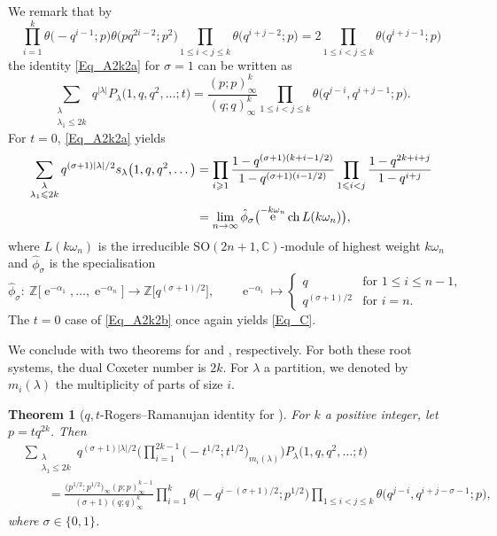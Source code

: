 \documentclass[pdftex]{sigma}
\numberwithin{equation}{section}
\newtheorem{Theorem}{Theorem}[section]
\renewcommand{\leq}{\leqslant}
\renewcommand{\geq}{\geqslant}
\DeclareMathOperator{\eup}{e}
\DeclareMathOperator{\ch}{ch}
\newcommand{\abs}[1]{\vert#1\vert}
\newcommand{\la}{\lambda}
\begin{document}
We remark that by
\[
\prod_{i=1}^k\theta\bigl(-q^{i-1};p\bigr)\theta\bigl(pq^{2i-2};p^2\bigr)
\prod_{1\leq i<j\leq k}\theta\bigl(q^{i+j-2};p\bigr)=
2\prod_{1\leq i<j\leq k}\theta\bigl(q^{i+j-1};p\bigr)
\]
the identity \eqref{Eq_A2k2a} for $\sigma=1$ can be written as
\[
\sum_{\substack{\la \\[1pt] \la_1\leq 2k}}
q^{\abs{\la}} P_{\la}\bigl(1,q,q^2,\dots;t\bigr)
=\frac{(p;p)_{\infty}^k}{(q;q)_{\infty}^k}
\prod_{1\leq i<j\leq k}\theta\bigl(q^{j-i},q^{i+j-1};p\bigr).
\]
For $t=0$, \eqref{Eq_A2k2a} yields
\begin{align}
\sum_{\substack{\la \\[1pt] \la_1\leq 2k}}
q^{(\sigma+1)\abs{\la}/2} s_{\la}\bigl(1,q,q^2,\dots\bigr)
&=\prod_{i\geq 1} \frac{1-q^{(\sigma+1)(k+i-1/2)}}
{1-q^{(\sigma+1)(i-1/2)}}
\prod_{1\leq i<j} \frac{1-q^{2k+i+j}}{1-q^{i+j}} \notag \\
&=\lim_{n\to\infty} \hat{\phi}_{\sigma}
\bigl(\eup^{-k\omega_n}\ch L(k\omega_n)\bigr),
\label{Eq_B}
\end{align}
where $L(k\omega_n)$ is the irreducible
$\mathrm{SO}(2n+1,\mathbb{C})$-module of highest weight $k\omega_n$
and $\hat{\phi}_{\sigma}$ is the specialisation
\[
\hat{\phi}_{\sigma}\colon\ \mathbb{Z}\bigl[\eup^{-\alpha_1},\dots,\eup^{-\alpha_n}\bigr]
\to\mathbb{Z}\bigl[q^{(\sigma+1)/2}\bigr],\qquad
\eup^{-\alpha_i}\mapsto \begin{cases}
q & \text{for $1\leq i\leq n-1$}, \\
q^{(\sigma+1)/2} & \text{for $i=n$}.\end{cases}
\]
The $t=0$ case of \eqref{Eq_A2k2b} once again yields \eqref{Eq_C}.

We conclude with two theorems for 
and , respectively.
For both these root systems, the dual Coxeter number is $2k$.
For $\la$ a partition, we denoted by $m_i(\la)$ the multiplicity
of parts of size $i$.

\begin{Theorem}[$q,t$-Rogers--Ramanujan identity for
]\label{Thm_qtRR3}
For $k$ a positive integer, let $p=tq^{2k}$. Then
\begin{align*}
&\sum_{\substack{\la \\[1pt] \la_1\leq 2k}} q^{(\sigma+1)\abs{\la}/2}
\Biggl( \prod_{i=1}^{2k-1}\bigl({-}t^{1/2};t^{1/2}\bigr)_{m_i(\la)}\Biggr)
P_{\la}\bigl(1,q,q^2,\dots;t\bigr) \\
&\qquad =\frac{\bigl(p^{1/2};p^{1/2}\bigr)_{\infty}
(p;p)_{\infty}^{k-1}}{(\sigma+1)(q;q)_{\infty}^k}
\prod_{i=1}^k \theta\bigl({-}q^{i-(\sigma+1)/2};p^{1/2}\bigr)
\prod_{1\leq i<j\leq k}\theta\bigl(q^{j-i},q^{i+j-\sigma-1};p\bigr),
\end{align*}
where $\sigma\in\{0,1\}$.
\end{Theorem}
\end{document}
